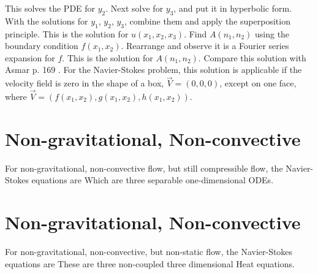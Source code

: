 \documentclass{article}
\begin{document}
This solves the PDE for $y_2$. Next solve for $y_3$, and put it in hyperbolic form.
With the solutions for $y_1$, $y_2$, $y_3$, combine them and apply the superposition principle.
This is the solution for $u(x_1,x_2,x_3)$. Find $A(n_1,n_2)$ using the boundary condition $f(x_1,x_2)$.
Rearrange  and observe it is a Fourier series expansion for $f$.
This is the solution for $A(n_1,n_2)$. Compare this solution with Asmar p. 169 \cite{asm}. For the Navier-Stokes problem, this solution is applicable if the velocity field is zero in the shape of a box, $\vec{V}=(0,0,0)$, except on one face, where $\vec{V}=(f(x_1,x_2),g(x_1,x_2),h(x_1,x_2))$.
\section{Non-gravitational, Non-convective}
For non-gravitational, non-convective flow, but still compressible flow, the Navier-Stokes equations are
Which are three separable one-dimensional ODEs.
\section{Non-gravitational, Non-convective}
For non-gravitational, non-convective, but non-static flow, the Navier-Stokes equations are
These are three non-coupled three dimensional Heat equations.
\printbibliography
\end{document}

